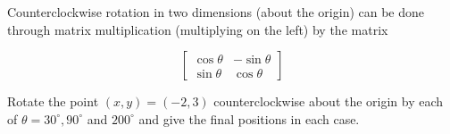 {Counterclockwise rotation in two dimensions (about the origin) can be done through matrix multiplication (multiplying on the left) by the matrix

\[
\left[
\begin{array}{cc}
\cos \theta & - \sin \theta\\
\sin \theta & \cos \theta
\end{array}
\right]
\]

Rotate the point $(x,y) = (-2,3)$ counterclockwise about the origin by each of $\theta = 30^{\circ}, 90^\circ$ and $200^\circ$ and give the final positions in each case.}
{}